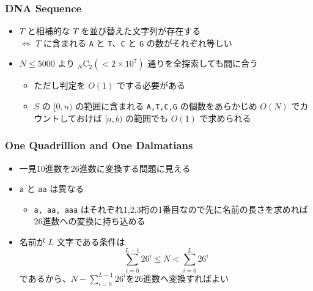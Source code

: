 \documentclass[t, aspectratio=169, dvipdfmx]{beamer}
\newcommand{\comb}[2]{{}_{#1}\mathrm{C}_{#2}}
\begin{document}
\begin{frame}[containsverbatim]
  \frametitle{DNA Sequence}
  \begin{itemize}
    \item $T$ と相補的な $T$ を並び替えた文字列が存在する \\
    $\iff$ $T$ に含まれる \verb|A| と \verb|T|、\verb|C| と \verb|G| の数がそれぞれ等しい
    \item $N \leq 5000$ より $\comb{N}{2}(<2 \times 10^7)$ 通りを全探索しても間に合う
    \begin{itemize}
      \item ただし判定を $O(1)$ でする必要がある
      \item $S$ の $[0, n)$ の範囲に含まれる \verb|A,T,C,G| の個数をあらかじめ $O(N)$ でカウントしておけば $[a,b)$ の範囲でも $O(1)$ で求められる
    \end{itemize}
  \end{itemize}
\end{frame}

\begin{frame}[containsverbatim]
  \frametitle{One Quadrillion and One Dalmatians}
  \begin{itemize}
    \item 一見10進数を26進数に変換する問題に見える
    \item \verb|a| と \verb|aa| は異なる
    \begin{itemize}
      \item \verb|a, aa, aaa| はそれぞれ1,2,3桁の1番目なので先に名前の長さを求めれば26進数への変換に持ち込める
    \end{itemize}
    \item 名前が $L$ 文字である条件は
    $$\sum_{i=0}^{L-1}26^i \leq N < \sum_{i=0}^{L}26^i$$
    であるから、$N - \sum_{i=0}^{L-1}26^i$を26進数へ変換すればよい
  \end{itemize}
\end{frame}

\begin{frame}[c]
\end{frame}
\end{document}
